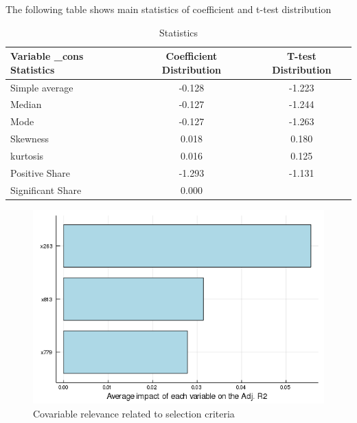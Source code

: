 \documentclass{article}
\begin{document}
\vspace{1cm}

The following table shows main statistics of coefficient and t-test distribution 

\begin{table}[!h]
    \centering
    \caption{Statistics}
    \begin{tabular}{|l|c|c|}
    \hline
    Variable _cons Statistics &  Coefficient Distribution &  T-test Distribution  \\
    \hline
    \hline
    Simple average    & -0.128      & -1.223 \\
    \hline
    Median            & -0.127   & -1.244 \\
    \hline
    Mode              & -0.127     & -1.263 \\
    \hline
    Skewness          & 0.018      & 0.180 \\
    \hline
    kurtosis          & 0.016     & 0.125 \\
    \hline
    Positive Share    & -1.293     & -1.131 \\
    \hline
    Significant Share & 0.000 &  \\
    \hline
    \end{tabular}
\end{table}

\clearpage

\begin{figure}[!ht]
    \centering
    \caption{Covariable relevance related to selection criteria}
    \includegraphics[scale=0.6]{cov_relevance.png}
\end{figure}

\end{document}
